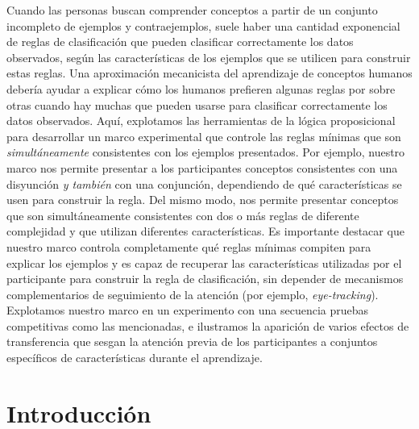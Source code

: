 Cuando las personas buscan comprender conceptos a partir de un conjunto incompleto de ejemplos y contraejemplos, suele haber una cantidad exponencial de reglas de clasificación que pueden clasificar correctamente los datos observados, según las características de los ejemplos que se utilicen para construir estas reglas. Una aproximación mecanicista del aprendizaje de conceptos humanos debería ayudar a explicar cómo los humanos prefieren algunas reglas por sobre otras cuando hay muchas que pueden usarse para clasificar correctamente los datos observados. Aquí, explotamos las herramientas de la lógica proposicional para desarrollar un marco experimental que controle las reglas mínimas que son \textit{simultáneamente} consistentes con los ejemplos presentados. Por ejemplo, nuestro marco nos permite presentar a los participantes conceptos consistentes con una disyunción \textit{y también} con una conjunción, dependiendo de qué características se usen para construir la regla. Del mismo modo, nos permite presentar conceptos que son simultáneamente consistentes con dos o más reglas de diferente complejidad y que utilizan diferentes características. Es importante destacar que nuestro marco controla completamente qué reglas mínimas compiten para explicar los ejemplos y es capaz de recuperar las características utilizadas por el participante para construir la regla de clasificación, sin depender de mecanismos complementarios de seguimiento de la atención (por ejemplo, {\em eye-tracking}). Explotamos nuestro marco en un experimento con una secuencia pruebas competitivas como las mencionadas, e ilustramos la aparición de varios efectos de transferencia que sesgan la atención previa de los participantes a conjuntos específicos de características durante el aprendizaje.

\section{Introducción}

